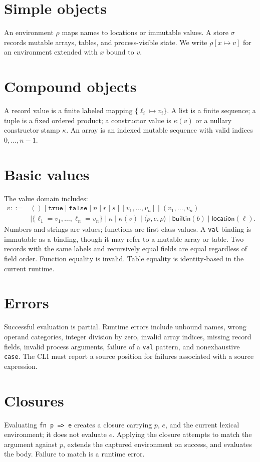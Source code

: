 \documentclass[11pt,oneside,openany]{book}
\newcommand{\kw}[1]{\texttt{#1}}
\newcommand{\state}{\sigma}
\newcommand{\env}{\rho}
\begin{document}
\section{Simple objects}
An environment $\env$ maps names to locations or immutable values. A store $\state$ records mutable arrays, tables, and process-visible state. We write $\env[x\mapsto v]$ for an environment extended with $x$ bound to $v$.

\section{Compound objects}
A record value is a finite labeled mapping $\{\ell_i\mapsto v_i\}$. A list is a finite sequence; a tuple is a fixed ordered product; a constructor value is $\kappa(v)$ or a nullary constructor stamp $\kappa$. An array is an indexed mutable sequence with valid indices $0,\ldots,n-1$.

\section{Basic values}
The value domain includes:
\[
\begin{split}
v ::= {}& () \mid \mathtt{true}\mid\mathtt{false}\mid n\mid r\mid s
\mid [v_1,\ldots,v_n]\mid(v_1,\ldots,v_n)\\
&\mid\{\ell_1=v_1,\ldots,\ell_n=v_n\}
\mid\kappa\mid\kappa(v)\mid\langle p,e,\env\rangle
\mid\mathsf{builtin}(b)\mid\mathsf{location}(\ell).
\end{split}
\]
Numbers and strings are values; functions are first-class values. A \kw{val} binding is immutable as a binding, though it may refer to a mutable array or table. Two records with the same labels and recursively equal fields are equal regardless of field order. Function equality is invalid. Table equality is identity-based in the current runtime.

\section{Errors}
Successful evaluation is partial. Runtime errors include unbound names, wrong operand categories, integer division by zero, invalid array indices, missing record fields, invalid process arguments, failure of a \kw{val} pattern, and nonexhaustive \kw{case}. The CLI must report a source position for failures associated with a source expression.

\section{Closures}
Evaluating \kw{fn p => e} creates a closure carrying $p$, $e$, and the current lexical environment; it does not evaluate $e$. Applying the closure attempts to match the argument against $p$, extends the captured environment on success, and evaluates the body. Failure to match is a runtime error.
\end{document}

